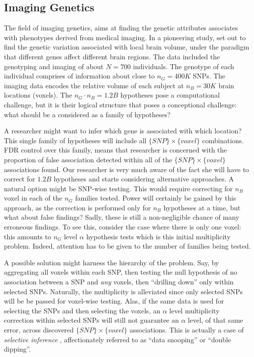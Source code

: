 \documentclass[draft,12pt]{article}
\begin{document}


\subsection{\label{eg:imaging_genetics}Imaging Genetics}
The field of imaging genetics, aims at finding the genetic attributes associates with phenotypes derived from medical imaging. In a pioneering study, \citet{stein_voxelwise_2010} set out to find the genetic variation associated with local brain volume, under the paradigm that different genes affect different brain regions. The data included the genotyping and imaging of about $N=700$ individuals. The genotype of each individual comprises of information about close to $n_G=400K$ SNPs. The imaging data encodes the relative volume of each subject at $n_B=30K$ brain locations (voxels). The $n_G \cdot n_B=1.2B$ hypotheses pose a computational challenge, but it is their logical structure that poses a conceptional challenge: what should be a considered as a family of hypotheses?

A researcher might want to infer which gene is associated with which location? This single family of hypotheses will include all $\{SNP\} \times \{voxel\}$ combinations. FDR control over this family, means that researcher is concerned with the proportion of false association detected within all of the $\{SNP\} \times \{voxel\}$ associations found. Our researcher is very much aware of the fact she will have to correct for $1.2B$ hypotheses and starts considering alternative approaches. A natural option might be SNP-wise testing. This would require correcting for $n_B$ voxel in each of the $n_G$  families tested. Power will certainly be gained by this approach, as the correction is performed only for $n_B$ hypotheses at a time, but what about false findings? Sadly, these is still a non-negligible chance of many erroneous findings. To see this, consider the case where there is only one voxel: this amounts to $n_G$ level $\alpha$ hypothesis tests which is this initial multiplicity problem. Indeed, attention has to be given to the number of families being tested. 

A possible solution might harness the hierarchy of the problem. Say, by aggregating all voxels within each SNP, then testing the null hypothesis of no association between a SNP and \emph{any} voxels, then ``drilling down'' only within selected SNPs. Naturally, the multiplicity is alleviated since only selected SNPs will be be passed for voxel-wise testing. Alas, if the same data is used for selecting the SNPs and then selecting the voxels, an $\alpha$ level multiplicity correction within selected SNPs will still not guarantee an $\alpha$ level, of that same error, across discovered $\{SNP\} \times \{voxel\}$ associations. This is actually a case of \emph{selective inference} \citep{benjamini_simultaneous_2010}, affectionately  referred to as ``data snooping'' or ``double dipping''. 
\end{document}
